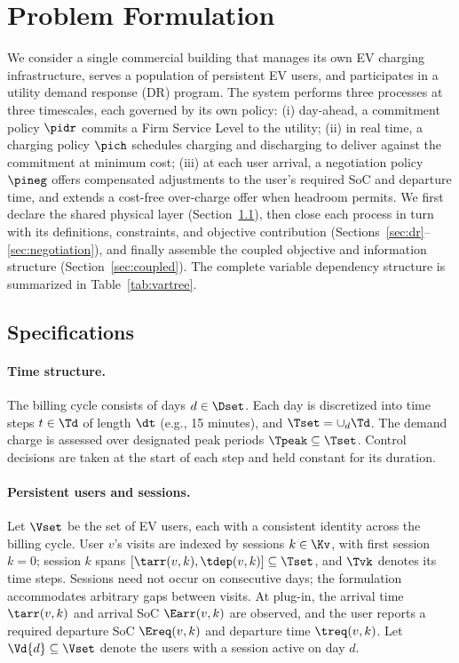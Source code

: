 \section{Problem Formulation}\label{sec:formulation}



We consider a single commercial building that manages its own EV charging
infrastructure, serves a population of persistent EV users, and
participates in a utility demand response (DR) program. The system
performs three processes at three timescales, each governed by its own
policy: (i) day-ahead, a commitment policy $\pidr$ commits a Firm Service
Level to the utility; (ii) in real time, a charging policy $\pich$
schedules charging and discharging to deliver against the commitment at
minimum cost; (iii) at each user arrival, a negotiation policy $\pineg$
offers compensated adjustments to the user's required SoC and departure
time, and extends a cost-free over-charge offer when headroom permits. We
first declare the shared physical layer (Section~\ref{sec:specs}), then
close each process in turn with its definitions, constraints, and
objective contribution
(Sections~\ref{sec:dr}--\ref{sec:negotiation}), and finally assemble the
coupled objective and information structure
(Section~\ref{sec:coupled}). The complete variable dependency structure
is summarized in Table~\ref{tab:vartree}.

\subsection{Specifications}\label{sec:specs}

\paragraph{Time structure.} The billing cycle consists of days $d \in
\Dset$. Each day is discretized into time steps $t \in \Td$ of length
$\dt$ (e.g., 15 minutes), and $\Tset = \cup_d \Td$. The demand charge is
assessed over designated peak periods $\Tpeak \subseteq \Tset$. Control
decisions are taken at the start of each step and held constant for its
duration.

\paragraph{Persistent users and sessions.} Let $\Vset$ be the set of EV
users, each with a consistent identity across the billing cycle. User
$v$'s visits are indexed by sessions $k \in \Kv$, with first session $k =
0$; session $k$ spans $[\tarr(v,k), \tdep(v,k)] \subseteq \Tset$, and
$\Tvk$ denotes its time steps. Sessions need not occur on consecutive
days; the formulation accommodates arbitrary gaps between visits. At
plug-in, the arrival time $\tarr(v,k)$ and arrival SoC $\Earr(v,k)$ are
observed, and the user reports a required departure SoC $\Ereq(v,k)$ and
departure time $\treq(v,k)$. Let $\Vd{d} \subseteq \Vset$ denote the
users with a session active on day $d$.


